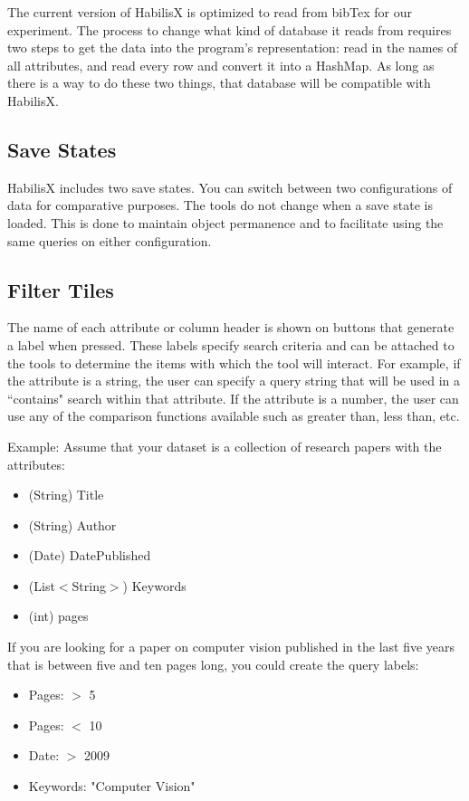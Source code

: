 \documentclass{article}
\begin{document}
The current version of HabilisX is optimized to read from bibTex for our experiment.  The process to change what kind of database it reads from requires two steps to get the data into the program's representation:  read in the names of all attributes, and read every row and convert it into a HashMap.  As long as there is a way to do these two things, that database will be compatible with HabilisX.

\subsection{Save States}
HabilisX includes two save states.  You can switch between two configurations of data for comparative purposes.  The tools do not change when a save state is loaded.  This is done to maintain object permanence and to facilitate using the same queries on either configuration.  

\subsection{Filter Tiles}
The name of each attribute or column header is shown on buttons that generate a label when pressed. These labels specify search criteria and can be attached to the tools to determine the items with which the tool will interact. For example, if the attribute is a string, the user can specify a query string that will be used in a ``contains" search within that attribute. If the attribute is a number, the user can use any of the comparison functions available such as greater than, less than, etc. 

Example: Assume that your dataset is a collection of research papers with the attributes: 
\begin{itemize}
\item{(String) Title }
\item{(String) Author }
\item{(Date) DatePublished}
\item{(List$<$String$>$) Keywords}
\item{(int) pages}

\end{itemize}

If you are looking for a paper on computer vision published in the last five years that is between five and ten pages long, you could create the query labels:
\begin{itemize}
\item Pages: $>$ 5
\item Pages: $<$ 10
\item Date: $>$ 2009
\item Keywords: "Computer Vision"
\end{itemize}
\end{document}
